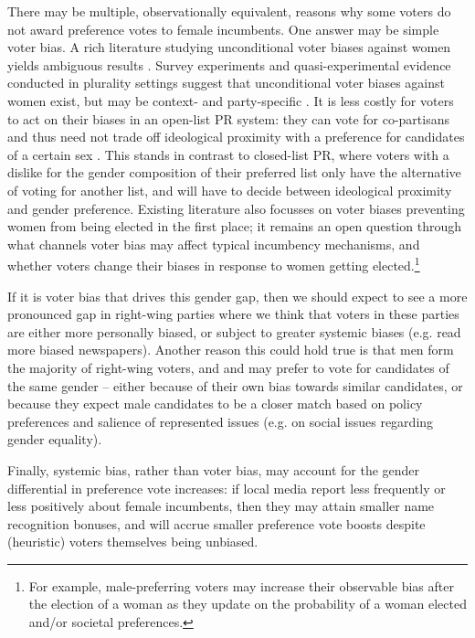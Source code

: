 \documentclass[12pt]{article}
\begin{document}
There may be multiple, observationally equivalent, reasons why some voters do not award preference votes to female incumbents. One answer may be simple voter bias. A rich literature studying unconditional voter biases against women yields ambiguous results \citep{krook2014,krook2018,golder2017a,ragauskas2019}. Survey experiments and quasi-experimental evidence conducted in plurality settings suggest that unconditional voter biases against women exist, but may be context- and party-specific \citep{anzia2019,eymmoud2017, horiuchi2020,cipullo2021}. It is less costly for voters to act on their biases in an open-list PR system: they can vote for co-partisans and thus need not trade off ideological proximity with a preference for candidates of a certain sex \citep[cf. aversive sexism, ][]{batista2020electoral}. This stands in contrast to closed-list PR, where voters with a dislike for the gender composition of their preferred list only have the alternative of voting for another list, and will have to decide between ideological proximity and gender preference. Existing literature also focusses on voter biases preventing women from being elected in the first place; it remains an open question through what channels voter bias may affect typical incumbency mechanisms, and whether voters change their biases in response to women getting elected.\footnote{For example, male-preferring voters may increase their observable bias after the election of a woman as they update on the probability of a woman elected and/or societal preferences.}

If it is voter bias that drives this gender gap, then we should expect to see a more pronounced gap in right-wing parties where we think that voters in these parties are either more personally biased, or subject to greater systemic biases (e.g. read more biased newspapers). Another reason this could hold true is that men form the majority of right-wing voters, and and may prefer to vote for candidates of the same gender -- either because of their own bias towards similar candidates, or because they expect male candidates to be a closer match based on policy preferences and salience of represented issues (e.g. on social issues regarding gender equality).

Finally, systemic bias, rather than voter bias, may account for the gender differential in preference vote increases: if local media report less frequently or less positively about female incumbents, then they may attain smaller name recognition bonuses, and will accrue smaller preference vote boosts despite (heuristic) voters themselves being unbiased.
\end{document}

